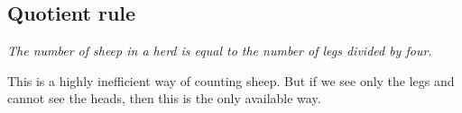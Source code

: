 

\setcounter{section}{1}
\setcounter{subsection}{4}
\setcounter{dfn}{3}

\subsection{Quotient rule}
\begin{center}
\parbox{.9\textwidth}{\emph{The number of sheep in a herd is equal to the number of legs divided by four.}}
\end{center}
This is a highly inefficient way of counting sheep.
But if we see only the legs and cannot see the heads, then this is the only available way.



